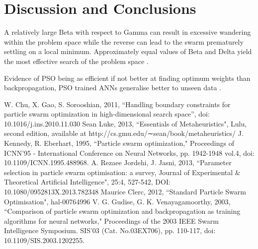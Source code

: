 \documentclass[12pt]{article}
\begin{document}
\vspace{-1.5em}
\section{Discussion and Conclusions}
\vspace{-1.5em}

A relatively large Beta with respect to Gamma can result in excessive wandering within the problem space while the reverse  can lead to the swarm prematurely settling on a local minimum. Approximately equal values of Beta and Delta yield the most effective search of the problem space \cite{Kennedy}.

Evidence of PSO being as efficient if not better at finding optimum weights than backpropagation, PSO trained ANNs generalise better to unseen data \cite{Kennedy}.


\vspace{-1.5em}
\begin{thebibliography}{10}

 W. Chu, X. Gao, S. Sorooshian, 2011, ``Handling boundary constraints for particle swarm optimization in high-dimensional search space'', doi: 10.1016/j.ins.2010.11.030
 Sean Luke, 2013, ``Essentials of Metaheuristics", Lulu, second edition, available at http://cs.gmu.edu/∼sean/book/metaheuristics/
 J. Kennedy, R. Eberhart, 1995, ``Particle swarm optimization," Proceedings of ICNN'95 - International Conference on Neural Networks,  pp. 1942-1948 vol.4, doi: 10.1109/ICNN.1995.488968.
 A. Rezaee Jordehi, J. Jasni, 2013, ``Parameter selection in particle swarm optimisation: a survey, Journal of Experimental \& Theoretical Artificial Intelligence", 25:4, 527-542, DOI: 10.1080/0952813X.2013.782348
 Maurice Clerc, 2012, ``Standard Particle Swarm Optimisation", hal-00764996
  V. G. Gudise, G. K. Venayagamoorthy, 2003, ``Comparison of particle swarm optimization and backpropagation as training algorithms for neural networks," Proceedings of the 2003 IEEE Swarm Intelligence Symposium. SIS'03 (Cat. No.03EX706), pp. 110-117, doi: 10.1109/SIS.2003.1202255.


\end{thebibliography}
\end{document}
